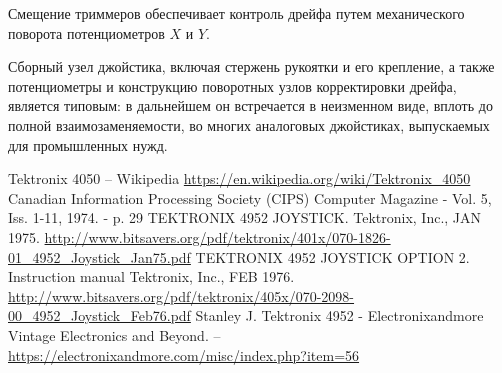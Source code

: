 \documentclass[11pt, a4paper]{article}
\begin{document}
Смещение триммеров обеспечивает контроль дрейфа путем механического поворота потенциометров $X$ и $Y$. 

Сборный узел джойстика, включая стержень рукоятки и его крепление, а также потенциометры и конструкцию поворотных узлов корректировки дрейфа, является типовым: в дальнейшем он встречается в неизменном виде, вплоть до полной взаимозаменяемости, во многих аналоговых джойстиках, выпускаемых для промышленных нужд.

\begin{thebibliography}{9}
 Tektronix 4050 -- Wikipedia \url{https://en.wikipedia.org/wiki/Tektronix_4050}
 Canadian Information Processing Society (CIPS) Computer Magazine - Vol. 5, Iss. 1-11, 1974. - p. 29
 TEKTRONIX 4952 JOYSTICK. Tektronix, Inc., JAN 1975. \url{http://www.bitsavers.org/pdf/tektronix/401x/070-1826-01_4952_Joystick_Jan75.pdf}
 TEKTRONIX 4952 JOYSTICK OPTION 2. Instruction manual Tektronix, Inc., FEB 1976. \url{http://www.bitsavers.org/pdf/tektronix/405x/070-2098-00_4952_Joystick_Feb76.pdf}
 Stanley J. Tektronix 4952 - Electronixandmore Vintage Electronics and Beyond. -- \url{https://electronixandmore.com/misc/index.php?item=56}
\end{thebibliography}
\end{document}
